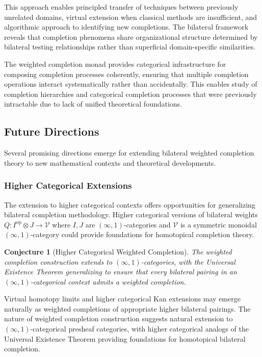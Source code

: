 \documentclass[11pt]{article}
\theoremstyle{plain}
\newtheorem{conjecture}[theorem]{Conjecture}
\theoremstyle{definition}
\theoremstyle{remark}
\newcommand{\V}{\mathcal{V}}
\newcommand{\op}{\mathrm{op}}
\begin{document}
This approach enables principled transfer of techniques between previously unrelated domains, virtual extension when classical methods are insufficient, and algorithmic approach to identifying new completions. The bilateral framework reveals that completion phenomena share organizational structure determined by bilateral testing relationships rather than superficial domain-specific similarities.

The weighted completion monad provides categorical infrastructure for composing completion processes coherently, ensuring that multiple completion operations interact systematically rather than accidentally. This enables study of completion hierarchies and categorical completion processes that were previously intractable due to lack of unified theoretical foundations.

\subsection{Future Directions}

Several promising directions emerge for extending bilateral weighted completion theory to new mathematical contexts and theoretical developments.

\subsubsection{Higher Categorical Extensions}

The extension to higher categorical contexts offers opportunities for generalizing bilateral completion methodology. Higher categorical versions of bilateral weights $Q : I^{\op} \otimes J \to \V$ where $I, J$ are $(\infty, 1)$-categories and $\V$ is a symmetric monoidal $(\infty, 1)$-category could provide foundations for homotopical completion theory.

\begin{conjecture}[Higher Categorical Weighted Completion]
The weighted completion construction extends to $(\infty, 1)$-categories, with the Universal Existence Theorem generalizing to ensure that every bilateral pairing in an $(\infty, 1)$-categorical context admits a weighted completion.
\end{conjecture}

Virtual homotopy limits and higher categorical Kan extensions may emerge naturally as weighted completions of appropriate higher bilateral pairings. The nature of weighted completion construction suggests natural extension to $(\infty, 1)$-categorical presheaf categories, with higher categorical analogs of the Universal Existence Theorem providing foundations for homotopical bilateral completion.
\end{document}
